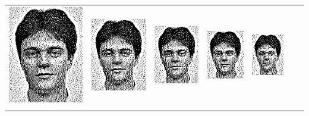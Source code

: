 \begin{tabular}{lllllll}
	\includegraphics{Ediphoto-3-3.png} &
	\includegraphics{Ediphoto-3-4.png} &
	\includegraphics{Ediphoto-3-5.png} &
	\includegraphics{Ediphoto-3-6.png} &
	\includegraphics{Ediphoto-3-7.png} \\
	 &
	 &
	 &
	 &
	 &
	 &
	 \\
\end{tabular}


